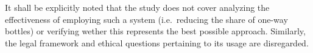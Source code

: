 It shall be explicitly noted that the study does not cover analyzing the effectiveness of employing such a system (i.e.~reducing the share of one-way bottles) or verifying wether this represents the best possible approach. Similarly, the legal framework and ethical questions pertaining to its usage are disregarded.




%
%
%
%
%

